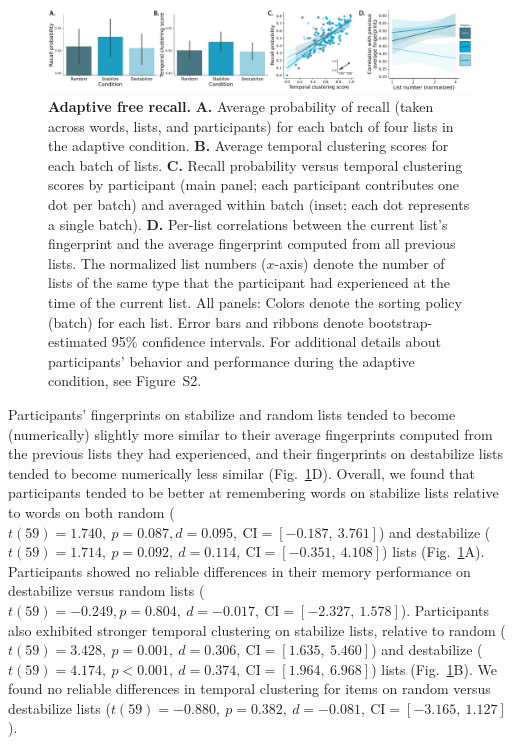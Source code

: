 \documentclass[11pt]{article}
\newcommand{\dynamicsAdaptive}{S2}
\begin{document}
\begin{figure}
    \centering

    \includegraphics[width=\textwidth]{figures/adaptive_results}

        \caption{\textbf{Adaptive free recall.} \textbf{A.} Average probability
        of recall (taken across words, lists, and participants) for each batch of
        four lists in the adaptive condition. \textbf{B.} Average temporal clustering scores
        for each batch of lists. \textbf{C.} Recall probability
        versus temporal clustering scores by participant (main panel; each
        participant contributes one dot per batch) and averaged within
        batch (inset; each dot represents a single batch). \textbf{D.}
        Per-list correlations between the current list's fingerprint and the
        average fingerprint computed from all previous lists. The normalized
        list numbers ($x$-axis) denote the number of lists of the same type
        that the participant had experienced at the time of the current list.
        All panels: Colors denote the sorting policy (batch) for each list.
        Error bars and ribbons denote bootstrap-estimated 95\% confidence
        intervals. For additional details about participants' behavior and
        performance during the adaptive condition, see
        Figure~\dynamicsAdaptive.}

    \label{fig:adaptive}
\end{figure}

Participants' fingerprints on stabilize and random lists tended to become
(numerically) slightly more similar to their average fingerprints computed from
the previous lists they had experienced, and their fingerprints on destabilize
lists tended to become numerically less similar (Fig.~\ref{fig:adaptive}D).
Overall, we found that participants tended to be better at remembering words on
stabilize lists relative to words on both random ($t(59) = 1.740,~p = 0.087, d
= 0.095,~\mathrm{CI} = [-0.187,~3.761]$) and destabilize ($t(59) = 1.714,~p =
0.092,~d = 0.114,~\mathrm{CI} = [-0.351,~4.108]$) lists
(Fig.~\ref{fig:adaptive}A). Participants showed no reliable differences in
their memory performance on destabilize versus random lists ($t(59) = -0.249, p
= 0.804,~d = -0.017,~\mathrm{CI} = [-2.327,~1.578]$). Participants also
exhibited stronger temporal clustering on stabilize lists, relative to random
($t(59) = 3.428,~p = 0.001,~d = 0.306,~\mathrm{CI} = [1.635,~5.460]$) and
destabilize ($t(59) = 4.174,~p < 0.001,~d = 0.374,~\mathrm{CI} = [1.964,~
6.968]$) lists (Fig.~\ref{fig:adaptive}B). We found no reliable differences in
temporal clustering for items on random versus destabilize lists ($t(59) =
-0.880,~p = 0.382,~d = -0.081,~\mathrm{CI} = [-3.165,~1.127]$).
\end{document}
